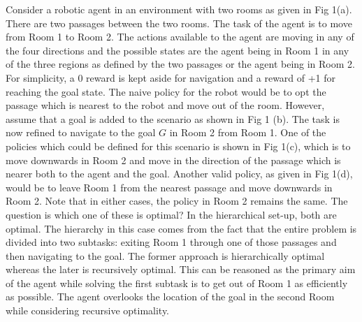 \iffalse
Consider a robotic agent in an environment with two rooms as given in Fig 1(a).
There are two passages between the two rooms. The task of the agent is to move from Room 1 to Room 2.
The actions available to the agent are moving in any of the four directions and the possible states
are the agent being in Room 1 in any of the three regions as defined by the two passages or the agent being in Room
2.  For simplicity, a 0 reward is kept aside for navigation and a reward of +1 for reaching the goal state.
The naive policy for the robot would be to opt the passage which is nearest to the robot and move out of the room.
However, assume that a goal is added to the scenario as shown in Fig 1 (b).
The task is now refined to navigate to the goal \(G\) in Room 2 from Room 1.
One of the policies which could be defined for this scenario is shown in Fig 1(c),
which is to move downwards in Room 2 and move in the direction of the passage which is nearer
both to the agent and the goal. Another valid policy, as given in Fig 1(d), would be to leave
Room 1 from the nearest passage and move downwards in Room 2. Note that in either cases,
the policy in Room 2 remains the same. The question is which one of these is optimal?
In the hierarchical set-up, both are optimal. The hierarchy in this case comes from the fact that
the entire problem is divided into two subtasks: exiting Room 1 through one of those passages and then
navigating to the goal. The former approach is hierarchically optimal whereas the later is recursively optimal.
This can be reasoned as the primary aim of the agent while solving the first subtask is to get out of Room 1
as efficiently as possible.
The agent overlooks the location of the goal in the second Room while considering recursive optimality.

